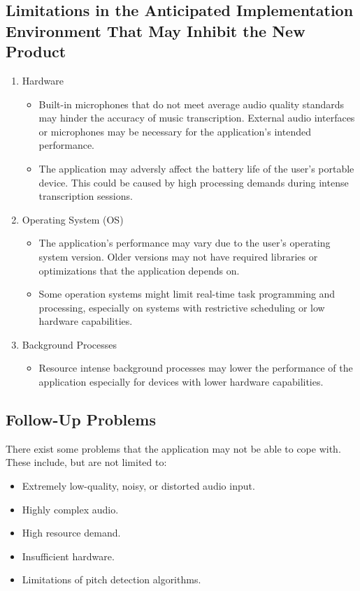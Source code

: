 \documentclass[12pt]{article}
\begin{document}
\subsection{Limitations in the Anticipated Implementation Environment That May
Inhibit the New Product}
\begin{enumerate}
  \item Hardware
  \begin{itemize}
    \item Built-in microphones that do not meet average audio quality standards may hinder the accuracy of music transcription. External 
     audio interfaces or microphones may be necessary for the application's intended performance.
     \item The application may adversly affect the battery life of the user's portable device. This could be caused by high processing demands
     during intense transcription sessions.
  \end{itemize}
  \item Operating System (OS)
  \begin{itemize}
    \item The application's performance may vary due to the user's operating system version. Older versions may 
     not have required libraries or optimizations that the application depends on.
     \item Some operation systems might limit real-time task programming and processing, especially on systems with restrictive 
     scheduling or low hardware capabilities.
  \end{itemize}
  \item Background Processes
  \begin{itemize}
    \item Resource intense background processes may lower the performance of the application especially for devices with
    lower hardware capabilities.
  \end{itemize}
\end {enumerate}
\subsection{Follow-Up Problems}
There exist some problems that the application may not be able to cope with. These include, but are not limited to: 
\begin{itemize}
  \item Extremely low-quality, noisy, or distorted audio input.
  \item Highly complex audio.
  \item High resource demand.
  \item Insufficient hardware.
  \item Limitations of pitch detection algorithms.
\end{itemize}
\end{document}
